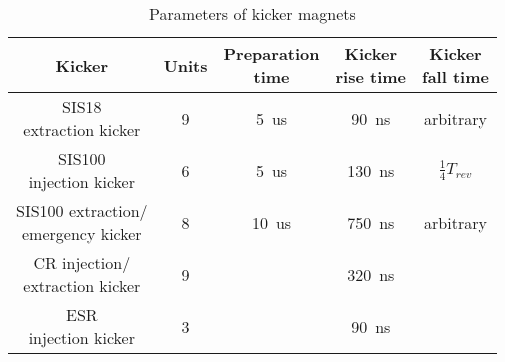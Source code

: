 
\label{kicker_time}

\begin{table}[!htb]

\caption{Parameters of kicker magnets}
\label{requirement}
\begin{center}
    \begin{tabular}{ | c | c | c | c| c |}
    \hline
\rowcolor[gray]{0.5}
Kicker 									&Units & \tabincell{c}{ Preparation\\time} & \tabincell{c}{Kicker \\rise time} & \tabincell{c}{ Kicker \\fall time} \\ \hline
\tabincell{c}{ SIS18 \\extraction kicker}			&	9	&	\SI{5}{us}			&	\SI{90}{ns} 		& arbitrary\\ \hline
\tabincell{c}{ SIS100 \\injection kicker}			&	6	&	\SI{5}{us} 		&	\SI{130}{ns} 		&	$\frac{1}{4}T_\mathit{rev}$	\\ \hline
\tabincell{c}{ SIS100 extraction/ \\emergency kicker}	&	8	&	\SI{10}{us}		&\SI{750}{ns} 			& arbitrary\\ \hline
\tabincell{c}{ CR injection/ \\extraction kicker}	&	9	&					&	\SI{320}{ns} 		&\\ \hline
\tabincell{c}{ ESR \\injection kicker}  			&	3	& 					&	\SI{90}{ns} 		&\\ \hline

    \end{tabular}
\end{center}
\end{table}

